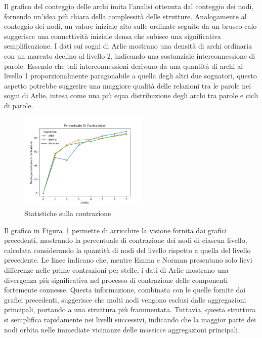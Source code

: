 Il grafico del conteggio delle archi imita l'analisi ottenuta dal conteggio dei nodi, fornendo un'idea più chiara
della complessità delle strutture.
Analogamente al conteggio dei nodi, un valore iniziale alto sulle ordinate seguito da un brusco calo suggerisce
una connettività iniziale densa che subisce una significativa semplificazione.
I dati sui sogni di Arlie mostrano una densità di archi ordinaria con un marcato declino al livello 2, indicando una
sostanziale interconnessione di parole.
Essendo che tali interconnessioni derivano da una quantità di archi al livello 1 proporzionalmente
paragonabile a quella degli altri due sognatori, questo aspetto potrebbe suggerire una maggiore qualità delle relazioni
tra le parole nei sogni di Arlie, intesa come una più equa distribuzione degli archi tra parole e cicli di parole.

\begin{figure}
   \vspace{-5pt}
    \includegraphics[width=0.55\textwidth]{Immagini/percentuale_di_contrazione}
    \caption{Statistiche sulla contrazione}\label{fig:contraction_percentage}
   \vspace{-5pt}
\end{figure}

Il grafico in Figura~\ref{fig:contraction_percentage} permette di arricchire la visione fornita dai grafici precedenti,
mostrando la percentuale di contrazione dei nodi di ciascun livello, calcolata considerando la quantità di nodi del
livello rispetto a quella del livello precedente.
Le linee indicano che, mentre Emma e Norman presentano solo lievi differenze nelle prime contrazioni per stelle, i dati
di Arlie mostrano una divergenza più significativa nel processo di contrazione delle componenti fortemente connesse.
Questa informazione, combinata con le quelle fornite dai grafici precedenti, suggerisce che molti nodi vengono esclusi
dalle aggregazioni principali, portando a una struttura più frammentata.
Tuttavia, questa struttura si semplifica rapidamente nei livelli successivi, indicando che la maggior parte dei nodi
orbita nelle immediate vicinanze delle massicce aggregazioni principali.


